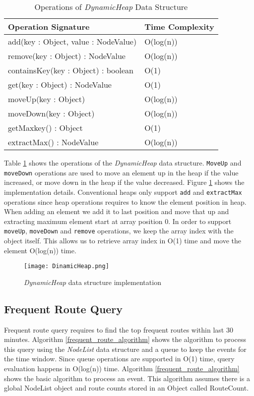 \begin{table}
\centering
\caption{Operations of \textit{DynamicHeap} Data Structure}
\begin{tabular}{|l|l|} \hline
Operation Signature & Time Complexity \\ \hline \hline
add(key : Object, value : NodeValue) & O(log(n)) \\ \hline
remove(key : Object) : NodeValue & O(log(n)) \\ \hline
containsKey(key : Object) : boolean & O(1) \\ \hline
get(key : Object) : NodeValue & O(1) \\ \hline
moveUp(key : Object) & O(log(n)) \\ \hline
moveDown(key : Object) & O(log(n)) \\ \hline
getMaxkey() : Object & O(1) \\ \hline
extractMax() : NodeValue & O(log(n)) \\ \hline
\end{tabular}
\label{dynamicheap_api}
\end{table}

Table \ref{dynamicheap_api} shows the operations of the \textit{DynamicHeap} data structure. \texttt{MoveUp} and \texttt{moveDown} operations are used to move an element up in the heap if the value increased, or move down in the heap if the value decreased. Figure \ref{dynamicheap_impl} shows the implementation details. Conventional heaps only support \texttt{add} and \texttt{extractMax} operations since heap operations requires to know the element position in heap. When adding an element we add it to last position and move that up and extracting maximum element start at array position 0. In order to support \texttt{moveUp}, \texttt{moveDown} and \texttt{remove} operations, we keep the array index with the object itself. This allows us to retrieve array index in O(1) time and move the element O(log(n)) time.


\begin{figure}[!t]
        \centering
        \texttt{[image: DinamicHeap.png]}
        \caption{\textit{DynamicHeap} data structure implementation}
        \label{dynamicheap_impl}
\end{figure}

\subsection{Frequent Route Query}

Frequent route query requires to find the top frequent routes within last 30 minutes. Algorithm \ref{frequent_route_algorithm} shows the algorithm to process this query using the \textit{NodeList} data structure and a queue to keep the events for the time window.  Since queue operations are supported in O(1) time, query evaluation happens in O(log(n)) time. Algorithm \ref{frequent_route_algorithm} shows the basic algorithm to process an event. This algorithm assumes there is a global NodeList object and route counts stored in an Object called RouteCount. 

